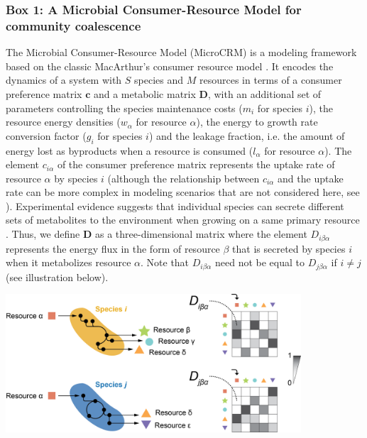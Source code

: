 \documentclass[a4paper,10pt]{article}
\begin{document}
\begin{mdframed}
\internallinenumbers
\subsubsection*{Box 1: A Microbial Consumer-Resource Model for community coalescence}
\label{box1}

The Microbial Consumer-Resource Model (MicroCRM) \cite{Goldford2018,Marsland2019,Marsland2020}
is a modeling framework based on the classic MacArthur's consumer resource model
\cite{MacArthur1970}.
It encodes the dynamics of a system with $S$ species and $M$ resources
in terms of a consumer preference matrix $\mathbf{c}$ and a metabolic matrix $\mathbf{D}$,
with an additional set of parameters controlling
the species maintenance costs ($m_i$ for species $i$),
the resource energy densities ($w_\alpha$ for resource $\alpha$),
the energy to growth rate conversion factor ($g_i$ for species $i$)
and the leakage fraction, i.e. the amount of energy lost as byproducts when a resource is consumed
($l_\alpha$ for resource $\alpha$).
The element $c_{i\alpha}$ of the consumer preference matrix
represents the uptake rate of resource $\alpha$ by
species $i$ (although the relationship between $c_{i\alpha}$ and the uptake rate can be more
complex in modeling scenarios that are not considered here,
see \cite{Goldford2018,Marsland2019,Marsland2020}).
Experimental evidence suggests that individual species can secrete different sets of metabolites
to the environment when growing on a same primary resource
\cite{Harcombe2014,Pinu2018,Estrela2020}.
Thus, we define $\mathbf{D}$ as a three-dimensional matrix
where the element $D_{i\beta\alpha}$ represents the energy flux in the form of resource $\beta$
that is secreted by species $i$ when it metabolizes resource $\alpha$.
Note that $D_{i\beta\alpha}$ need not be equal to $D_{j\beta\alpha}$ if $i \neq j$
(see illustration below).

\bigskip
\begin{center}
\includegraphics[width=11cm,keepaspectratio]{figs/figBox_v4.png}
\end{center}
\bigskip


\end{mdframed}
\end{document}
